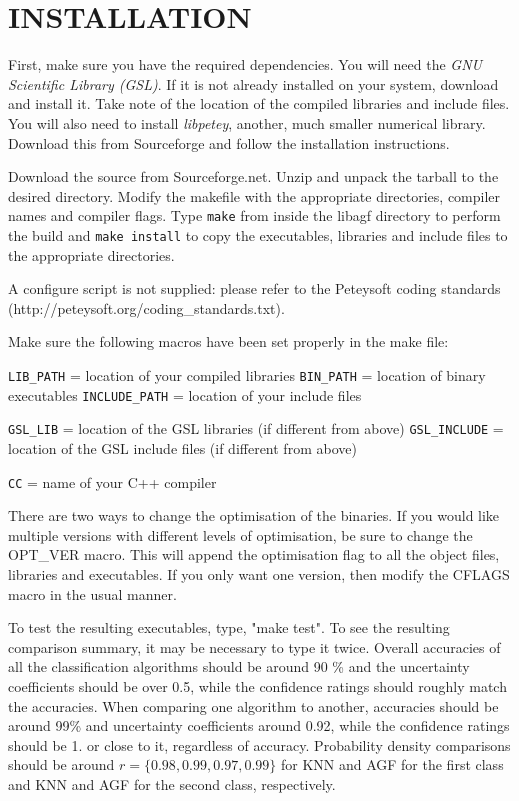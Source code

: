 \documentclass[12pt]{article}
\begin{document}
\section{INSTALLATION}

  First, make sure you have the required dependencies.  You will need the {\it GNU Scientific Library (GSL)}.  If it is not already installed on your system, download and install it.  Take note of the location of the compiled libraries and include files.  You will also need to install {\it libpetey}, another, much smaller numerical library.  Download this from Sourceforge and follow the installation instructions.

  Download the source from Sourceforge.net.  Unzip and unpack the tarball to the desired directory.  Modify the makefile with the appropriate directories, compiler names and compiler flags.  Type \verb"make" from inside the libagf directory to perform the build and \verb"make install" to copy the executables, libraries and include files to the appropriate directories.

  A configure script is not supplied: please refer to the Peteysoft coding standards (http://peteysoft.org/coding\_standards.txt).

  Make sure the following macros have been set properly in the make file:

\verb/LIB_PATH/ = location of your compiled libraries\newline
\verb/BIN_PATH/ = location of binary executables\newline
\verb/INCLUDE_PATH/ = location of your include files

\verb/GSL_LIB/ = location of the GSL libraries (if different from above)\newline
\verb/GSL_INCLUDE/ = location of the GSL include files (if different from above)

\verb/CC/ = name of your C++ compiler

  There are two ways to change the optimisation of the binaries.  If you would like multiple versions with different levels of optimisation, be sure to change the OPT\_VER macro.  This will append the optimisation flag to all the object files, libraries and executables.  If you only want one version, then modify the CFLAGS macro in the usual manner.

  To test the resulting executables, type, "make test".  To see the resulting comparison summary, it may be necessary to type it twice.  Overall accuracies of all the classification algorithms should be around 90 \% and the uncertainty coefficients should be over 0.5, while the confidence ratings should roughly match the accuracies.  When comparing one algorithm to another, accuracies should be around 99\% and uncertainty coefficients around 0.92, while the confidence ratings should be 1. or close to it, regardless of accuracy.  Probability density comparisons should be around $r=\lbrace 0.98, 0.99, 0.97, 0.99 \rbrace$ for KNN and AGF for the first class and KNN and AGF for the second class, respectively.
\end{document}
